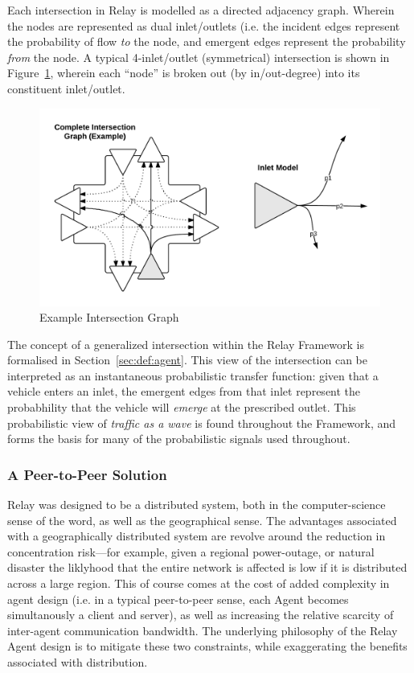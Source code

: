 \documentclass{report}
\begin{document}
Each intersection in Relay is modelled as a directed adjacency graph.
Wherein the nodes are represented as dual inlet/outlets (i.e. the incident edges represent the probability of flow \emph{to} the node, and emergent edges represent the probability \emph{from} the node.
A typical 4-inlet/outlet (symmetrical) intersection is shown in Figure~\ref{fig:intersection_graph}, wherein each ``node'' is broken out (by in/out-degree) into its constituent inlet/outlet.
\begin{figure}[!htpb]
	\caption{Example Intersection Graph}
	\label{fig:intersection_graph}
	\includegraphics[width=\textwidth]{figures/Relay_Intersection_Graph.png}
\end{figure}

The concept of a generalized intersection within the Relay Framework is formalised in Section~\ref{sec:def:agent}.
This view of the intersection can be interpreted as an instantaneous probabilistic transfer function: given that a vehicle enters an inlet, the emergent edges from that inlet represent the probabhility that the vehicle will \emph{emerge} at the prescribed outlet.
This probabilistic view of \emph{traffic as a wave} is found throughout the Framework, and forms the basis for many of the probabilistic signals used throughout.


\subsubsection{A Peer-to-Peer Solution}
\label{sec:p2p_philosophy}

Relay was designed to be a distributed system, both in the computer-science sense of the word, as well as the geographical sense.
The advantages associated with a geographically distributed system are revolve around the reduction in concentration risk---for example, given a regional power-outage, or natural disaster the liklyhood that the entire network is affected is low if it is distributed across a large region.
This of course comes at the cost of added complexity in agent design (i.e. in a typical peer-to-peer sense, each Agent becomes simultanously a client and server), as well as increasing the relative scarcity of inter-agent communication bandwidth.
The underlying philosophy of the Relay Agent design is to mitigate these two constraints, while exaggerating the benefits associated with distribution.
\end{document}
